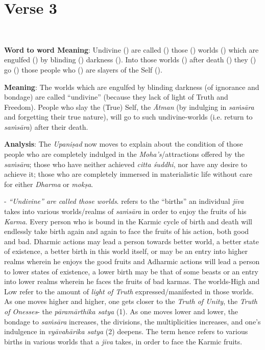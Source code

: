 \chapter{Verse 3}

\begin{moolashloka}
\\
\end{moolashloka}

\textbf{Word to word Meaning}: Undivine () are called () those () worlds () which are engulfed () by blinding () darkness (). Into those worlds () after death () they () go () those people who () are slayers of the Self ().

\textbf{Meaning}: The worlds which are engulfed by blinding darkness (of ignorance and bondage) are called ``undivine'' (because they lack of light of Truth and Freedom). People who slay the (True) Self, the \emph{Ātman} (by indulging in \emph{saṁsāra} and forgetting their true nature), will go to such undivine-worlds (i.e. return to \emph{saṁsāra}) after their death.

\textbf{Analysis}: The \emph{Upaniṣad} now moves to explain about the condition of those people who are completely indulged in the \emph{Moha's}/attractions offered by the \emph{saṁsāra}; those who have neither achieved \emph{citta śuddhi}, nor have any desire to achieve it; those who are completely immersed in materialistic life without care for either \emph{Dharma} or \emph{mokṣa}.

- \emph{``Undivine'' are called those worlds}.  refers to the ``births'' an individual \emph{jīva} takes into various worlds/realms of \emph{saṁsāra} in order to enjoy the fruits of his \emph{Karma}. Every person who is bound in the Karmic cycle of birth and death will endlessly take birth again and again to face the fruits of his action, both good and bad. Dharmic actions may lead a person towards better world, a better state of existence, a better birth in this world itself, or may be an entry into higher realms wherein he enjoys the good fruits and Adharmic actions will lead a person to lower states of existence, a lower birth may be that of some beasts or an entry into lower realms wherein he faces the fruits of bad karmas. The worlds-High and Low refer to the amount of \emph{light of Truth} expressed/manifested in those worlds. As one moves higher and higher, one gets closer to the \emph{Truth of Unity}, the \emph{Truth of Onesses}- the \emph{pāramārthika satya} (1). As one moves lower and lower, the bondage to \emph{saṁsāra} increases, the divisions, the multiplicities increases, and one's indulgence in \emph{vyāvahārika satya} (2) deepens. The term  hence refers to various births in various worlds that a \emph{jīva} takes, in order to face the Karmic fruits.

